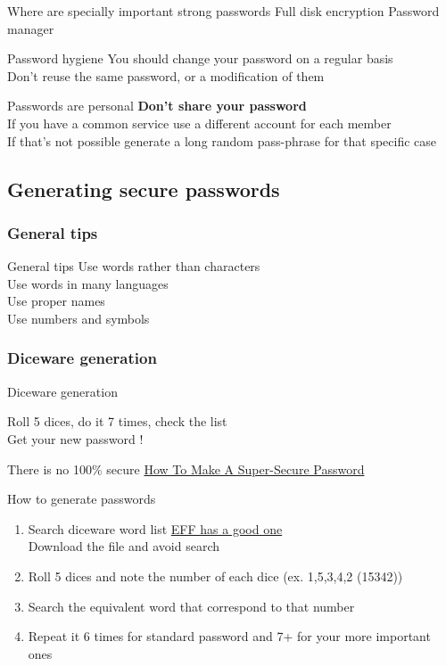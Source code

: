 \documentclass[11pt]{beamer}
\begin{document}
\begin{frame}{Where are  specially important strong passwords}
Full disk encryption
Password manager
\end{frame}
\begin{frame}{Password hygiene}
You should change your password on a regular basis\\
Don't reuse the same password, or a modification of them\\
\end{frame}
\begin{frame}{Passwords are personal}
\textbf{Don't share your password}\\
If you have a common service use a different account for each member\\
If that's not possible generate a long random pass-phrase for that specific case\\
\end{frame}
\subsection{Generating secure passwords}
\subsubsection{General  tips}
\begin{frame}{General  tips}
Use words rather than characters\\
Use words in many languages\\
Use proper names\\
Use numbers and symbols
\end{frame}
\subsubsection{Diceware generation}
\begin{frame}{Diceware generation}
\begin{center}
Roll 5 dices, do it 7 times, check the list\\
Get your new password !
\end{center}
\end{frame}
\begin{frame}{There is no 100\% secure}
\href{https://archive.org/details/how-to-make-a-super-secure-password}{How To Make A Super-Secure Password}
\end{frame}
\begin{frame}{How to generate passwords}
\begin{enumerate}
\item Search diceware word list \href{https://www.eff.org/files/2016/07/18/eff_large_wordlist.txt}{EFF has a good one}\\
Download the file and avoid search
\item Roll 5 dices and note the number of each dice (ex. 1,5,3,4,2 (15342))
\item Search the equivalent word that correspond to that number
\item Repeat it 6 times for standard password and 7+ for your more important ones
\end{enumerate}
\end{frame}
\end{document}
